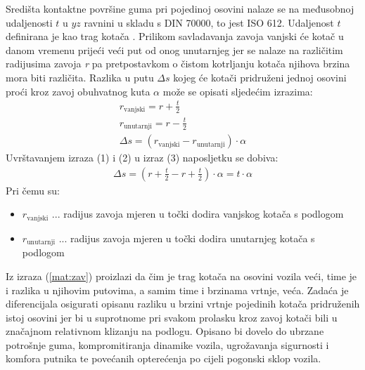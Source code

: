 \documentclass[11pt]{article}
\numberwithin{equation}{section}%
\begin{document}
Središta kontaktne površine guma pri pojedinoj osovini nalaze se na međusobnoj udaljenosti $t$ u $yz$ ravnini u skladu s DIN 70000, to jest ISO 612. Udaljenost $t$ definirana je kao trag kotača \cite{heiring11:chssis}. Prilikom savladavanja zavoja vanjski će kotač u danom vremenu prijeći veći put od onog unutarnjeg jer se nalaze na različitim radijusima zavoja \textit{r} pa pretpostavkom o čistom kotrljanju kotača njihova brzina mora biti različita. Razlika u putu $\Delta s$ kojeg će kotači pridruženi jednoj osovini proći kroz zavoj obuhvatnog kuta $\alpha$ može se opisati sljedećim izrazima:
\begin{gather}
r_\text{vanjski}=r+\frac{t}{2}\\
r_\text{unutarnji}=r-\frac{t}{2}\\
\Delta s=(r_\text{vanjski}-r_\text{unutarnji})\cdot \alpha
\end{gather}
Uvrštavanjem izraza (1) i (2) u izraz (3) naposljetku se dobiva:
\begin{gather}
\Delta s=(r+\frac{t}{2}-r+\frac{t}{2})\cdot \alpha=t\cdot \alpha \label{mat:zav}
\end{gather}
Pri čemu su:
\begin{itemize}
	\item[]$r_\text{vanjski}$ ... radijus zavoja mjeren u točki dodira vanjskog kotača s podlogom
	\item[]$r_\text{unutarnji}$ ... radijus zavoja mjeren u točki dodira unutarnjeg kotača s podlogom
\end{itemize}

Iz izraza (\ref{mat:zav}) proizlazi da čim je trag kotača na osovini vozila veći, time je i razlika u njihovim putovima, a samim time i brzinama vrtnje, veća. Zadaća je diferencijala osigurati opisanu razliku u brzini vrtnje pojedinih kotača pridruženih istoj osovini jer bi u suprotnome pri svakom prolasku kroz zavoj kotači bili u značajnom relativnom klizanju na podlogu. Opisano bi dovelo do ubrzane potrošnje guma, kompromitiranja dinamike vozila, ugrožavanja sigurnosti i komfora putnika te povećanih opterećenja po cijeli pogonski sklop vozila.
\end{document}
